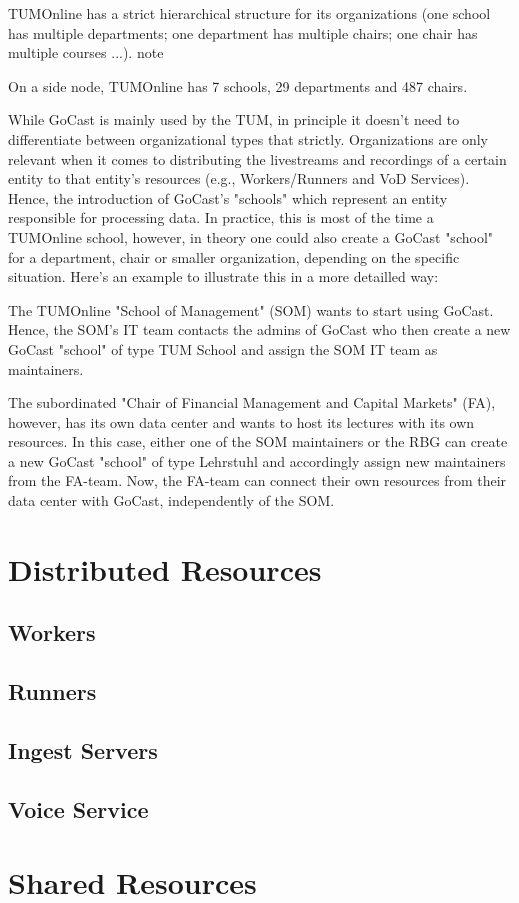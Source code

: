 TUMOnline has a strict hierarchical structure for its organizations (one school has multiple departments; one department has multiple chairs; one chair has multiple courses ...).
note

On a side node, TUMOnline has 7 schools, 29 departments and 487 chairs.

While GoCast is mainly used by the TUM, in principle it doesn't need to differentiate between organizational types that strictly. Organizations are only relevant when it comes to distributing the livestreams and recordings of a certain entity to that entity's resources (e.g., Workers/Runners and VoD Services). Hence, the introduction of GoCast's "schools" which represent an entity responsible for processing data. In practice, this is most of the time a TUMOnline school, however, in theory one could also create a GoCast "school" for a department, chair or smaller organization, depending on the specific situation.
Here's an example to illustrate this in a more detailled way:

    The TUMOnline "School of Management" (SOM) wants to start using GoCast. Hence, the SOM's IT team contacts the admins of GoCast who then create a new GoCast "school" of type TUM School and assign the SOM IT team as maintainers.

    The subordinated "Chair of Financial Management and Capital Markets" (FA), however, has its own data center and wants to host its lectures with its own resources. In this case, either one of the SOM maintainers or the RBG can create a new GoCast "school" of type Lehrstuhl and accordingly assign new maintainers from the FA-team. Now, the FA-team can connect their own resources from their data center with GoCast, independently of the SOM.

\section{Distributed Resources}

\subsection{Workers}
\subsection{Runners}
\subsection{Ingest Servers}
\subsection{Voice Service}

\section{Shared Resources}

